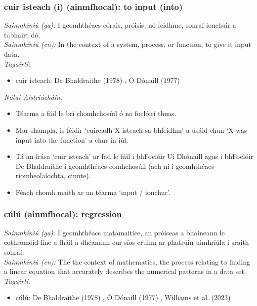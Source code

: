\documentclass{article}
\begin{document}
\subsubsection*{cuir isteach (i) (ainmfhocal): to input (into)}
 \noindent \textit{Sainmhíniú (ga):} I gcomhthéacs córais, próisis, nó feidhme, sonraí ionchuir a tabhairt dó.
\\
 \noindent \textit{Sainmhíniú (en):} In the context of a system, process, or function, to give it input data.
\\
 \noindent \textit{Tagairtí:}
\begin{itemize}
	\item cuir isteach: De Bhaldraithe (1978) \cite{de-bhaldraithe}, Ó Dónaill (1977) \cite{odonaill}
\end{itemize}

 \noindent \textit{Nótaí Aistriúcháin:}
\begin{itemize}
	\item Téarma a fáil le brí chomhchosúil ó na foclóirí thuas.
	\item Mar shampla, is féidir `cuireadh X isteach sa bhfeidhm' a úsáid chun `X was input into the function' a chur in iúl.
	\item Tá an frása `cuir isteach' ar fad le fáil i bhFoclóir Uí Dhónaill agus i bhFoclóir De Bhaldraithe i gcomhthéacs comhchosúil (ach ní i gcomhthéacs ríomheolaíochta, cinnte).
	\item Féach chomh maith ar an téarma `input / ionchur'.
\end{itemize}


\subsubsection*{cúlú (ainmfhocal): regression}
 \noindent \textit{Sainmhíniú (ga):} I gcomhthéacs matamaitice, an próiseas a bhaineann le cothromóid líne a fháil a dhéanann cur síos cruinn ar phatrúin uimhriúla i sraith sonraí.
\\
 \noindent \textit{Sainmhíniú (en):} The the context of mathematics, the process relating to finding a linear equation that accurately describes the numerical patterns in a data set.
\\
 \noindent \textit{Tagairtí:}
\begin{itemize}
	\item cúlú: De Bhaldraithe (1978) \cite{de-bhaldraithe}, Ó Dónaill (1977) \cite{odonaill}, Williams et al. (2023) \cite{storchiste}
\end{itemize}
\end{document}
